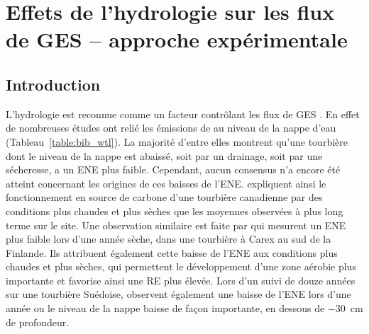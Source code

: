 \singlespacing
\chapter{Effets de l'hydrologie sur les flux de GES -- approche expérimentale}
\label{ch:4}

\minitoc

\newpage
\doublespacing
\section{Introduction}


L'hydrologie est reconnue comme un facteur contrôlant les flux de GES \citep{blodau2002}.
En effet de nombreuses études ont relié les émissions de \coo au niveau de la nappe d'eau (Tableau~\ref{table:bib_wtl}).
La majorité d'entre elles montrent qu'une tourbière dont le niveau de la nappe est abaissé, soit par un drainage, soit par une sécheresse, a un ENE plus faible.
Cependant, aucun consensus n'a encore été atteint concernant les origines de ces baisses de l'ENE.
\citet{strack2013} expliquent ainsi le fonctionnement en source de carbone d'une tourbière canadienne par des conditions plus chaudes et plus sèches que les moyennes observées à plus long terme sur le site.
Une observation similaire est faite par \citet{aurela2007} qui mesurent un ENE plus faible lors d'une année sèche, dans une tourbière à Carex au sud de la Finlande.
Ils attribuent également cette baisse de l'ENE aux conditions plus chaudes et plus sèches, qui permettent le développement d'une zone aérobie plus importante et favorise ainsi une RE plus élevée.
Lors d'un suivi de douze années sur une tourbière Suédoise, \citet{peichl2014} observent également une baisse de l'ENE lors d'une année ou le niveau de la nappe baisse de façon importante, en dessous de \SI{-30}{\centi\metre} de profondeur.

